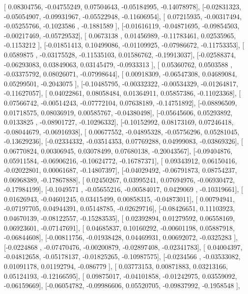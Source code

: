 \documentclass{article}
\begin{document}
       [ 0.08304756, -0.04755249,  0.07504643, -0.05184995, -0.14078978],
       [-0.02831323, -0.05054907, -0.09931967, -0.05522948, -0.11606954],
       [ 0.07215935, -0.00317494, -0.05255766, -0.1023586 , -0.1881589 ],
       [-0.01616119, -0.04871695, -0.09854503, -0.00217469, -0.05729532],
       [ 0.0673138 ,  0.01456989, -0.11783461,  0.02535965, -0.1153212 ],
       [-0.01851413,  0.10499086, -0.01109925, -0.07986672, -0.11753353],
       [ 0.0589875 , -0.03175528, -0.11535103,  0.01586762, -0.19913037],
       [-0.02588374, -0.06293083,  0.03849063,  0.03145479, -0.0933313 ],
       [ 0.05360762,  0.0503588 , -0.03375792,  0.08026071, -0.07998644],
       [ 0.00918309, -0.06547308,  0.04689084,  0.05299501, -0.2043075 ],
       [-0.10485795, -0.00332322, -0.00534329, -0.01264817, -0.11627057],
       [ 0.04022861,  0.08058484,  0.01364911,  0.05857386, -0.11023368],
       [ 0.07566742, -0.00514243, -0.07772104,  0.07638189, -0.14751892],
       [-0.08896509,  0.01718575,  0.08036919,  0.00585767, -0.04380498],
       [-0.05645606,  0.05293892,  0.0133825 , -0.08901727, -0.10296332],
       [-0.10152992,  0.08173169,  0.07246418, -0.08044679, -0.06916938],
       [ 0.00677552, -0.04895328, -0.05756296,  0.05281045, -0.13629236],
       [-0.02334332, -0.03514353,  0.07769288,  0.04999083, -0.03869326],
       [ 0.06770824,  0.00306945,  0.03078499,  0.07680138, -0.20043567],
       [-0.09404876,  0.05911584, -0.06906216, -0.10624772, -0.16787371],
       [ 0.09343912,  0.06150416, -0.02022801,  0.00061687, -0.14807397],
       [-0.04029492, -0.06791873,  0.08754237,  0.06968389, -0.17867888],
       [ 0.02450267,  0.03995241,  0.07694976, -0.06930472, -0.17984199],
       [-0.1049571 , -0.05655216, -0.00584017,  0.0429069 , -0.10319661],
       [ 0.01626943, -0.04601245,  0.03415499,  0.00858315, -0.04873011],
       [ 0.00794941, -0.07197705,  0.04944391,  0.05148785, -0.02629716],
       [-0.08426651,  0.11103923,  0.04670139, -0.08122557, -0.15283535],
       [ 0.02392894,  0.01279592,  0.06558169,  0.06923601, -0.07147691],
       [ 0.04685837,  0.10160292, -0.00601198,  0.05887918, -0.06844608],
       [-0.00811756, -0.01938428,  0.04469931,  0.00692072, -0.0325283 ],
       [-0.0224868 , -0.07470476, -0.00200879, -0.02897408, -0.02341783],
       [ 0.04004397, -0.04812658, -0.05178137, -0.01825265, -0.10987575],
       [-0.0234566 , -0.03533082,  0.01091178,  0.01192794, -0.086779  ],
       [ 0.03773153,  0.00871883,  0.03213166,  0.05124193, -0.12166595],
       [ 0.09875017, -0.04101858, -0.01242975,  0.03559092, -0.06159669],
       [-0.06054782, -0.09986606,  0.05520705, -0.09837992, -0.1958548 ],
\end{document}

